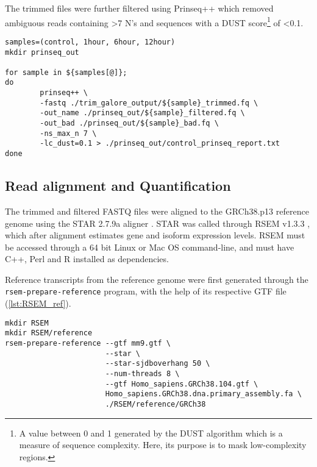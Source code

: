 The trimmed files were further filtered using Prinseq++ \citep{prinseq++} which removed ambiguous reads containing >7 N's and sequences with a DUST score\footnote{A value between 0 and 1 generated by the DUST algorithm which is a measure of sequence complexity. Here, its purpose is to mask low-complexity regions.} of <0.1.

\begin{lstlisting}[caption=Prinseq++ filtering]
samples=(control, 1hour, 6hour, 12hour)
mkdir prinseq_out

for sample in ${samples[@]};
do
        prinseq++ \
        -fastq ./trim_galore_output/${sample}_trimmed.fq \
        -out_name ./prinseq_out/${sample}_filtered.fq \
        -out_bad ./prinseq_out/${sample}_bad.fq \
        -ns_max_n 7 \
        -lc_dust=0.1 > ./prinseq_out/control_prinseq_report.txt
done
\end{lstlisting}

\subsection{Read alignment and Quantification}
The trimmed and filtered FASTQ files were aligned to the GRCh38.p13 reference genome \citep{ref} using the \ac{STAR} 2.7.9a aligner \citep{Dobin2013}. \ac{STAR} was called through RSEM v1.3.3 \citep{li2011rsem}, which after alignment estimates gene and isoform expression levels. RSEM must be accessed through a 64 bit Linux or Mac OS command-line, and must have C++, Perl and R installed as dependencies.

Reference transcripts from the reference genome were first generated through the \texttt{rsem-prepare-reference} program, with the help of its respective GTF file (\autoref{lst:RSEM_ref}). 


\begin{lstlisting}[caption= reference generation, label={lst:RSEM_ref}]
mkdir RSEM
mkdir RSEM/reference
rsem-prepare-reference --gtf mm9.gtf \
                       --star \
                       --star-sjdboverhang 50 \
                       --num-threads 8 \
                       --gtf Homo_sapiens.GRCh38.104.gtf \
                       Homo_sapiens.GRCh38.dna.primary_assembly.fa \
                       ./RSEM/reference/GRCh38
\end{lstlisting}

